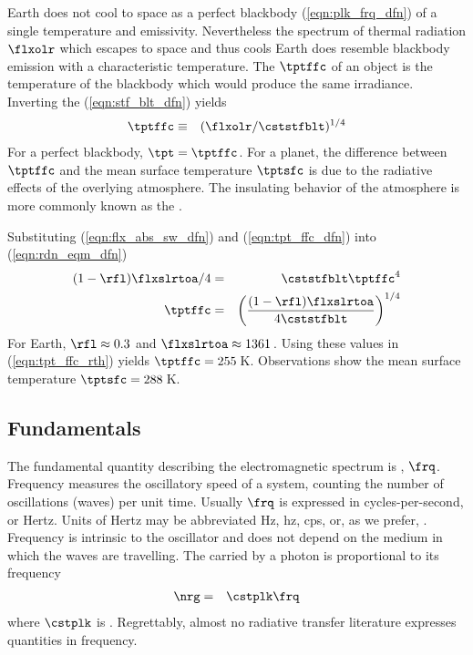 \documentclass[12pt]{article}
\begin{document}
Earth does not cool to space as a perfect blackbody
(\ref{eqn:plk_frq_dfn}) of a single temperature and emissivity.
Nevertheless the spectrum of thermal radiation $\flxolr$ which escapes
to space and thus cools Earth does resemble blackbody emission with a
characteristic temperature.
The  $\tptffc$ of an object is the
temperature of the blackbody which would produce the same irradiance.
Inverting the  (\ref{eqn:stf_blt_dfn})
yields
\begin{eqnarray}
\tptffc & \equiv & ( \flxolr / \cststfblt )^{1/4}
\label{eqn:tpt_ffc_dfn}
\end{eqnarray}
For a perfect blackbody, $\tpt = \tptffc$.
For a planet, the difference between $\tptffc$ and the mean surface 
temperature $\tptsfc$ is due to the radiative effects of the overlying
atmosphere.
The insulating behavior of the atmosphere is more commonly known as
the .

Substituting (\ref{eqn:flx_abs_sw_dfn}) and (\ref{eqn:tpt_ffc_dfn})
into (\ref{eqn:rdn_eqm_dfn})
\begin{eqnarray}
(1 - \rfl) \flxslrtoa / 4 & = & \cststfblt \tptffc^{4} \\
\tptffc & = & \left( \frac{(1 - \rfl) \flxslrtoa}
{4 \cststfblt} \right)^{1/4}
\label{eqn:tpt_ffc_rth}
\end{eqnarray}
For Earth, $\rfl \approx 0.3$ and $\flxslrtoa \approx 1361$\,\wxmS.
Using these values in (\ref{eqn:tpt_ffc_rth}) yields $\tptffc =
255$\,K\@.
Observations show the mean surface temperature $\tptsfc = 288$\,K\@.

\subsection[Fundamentals]{Fundamentals}\label{sxn:fnd}
The fundamental quantity describing the electromagnetic spectrum is
, $\frq$.
Frequency measures the oscillatory speed of a system, counting the
number of oscillations (waves) per unit time.
Usually $\frq$ is expressed in cycles-per-second, or Hertz.
Units of Hertz may be abbreviated Hz, hz, cps, or, as we prefer, \xs.
Frequency is intrinsic to the oscillator and does not depend on the
medium in which the waves are travelling.
The  carried by a photon is proportional to its
frequency 
\begin{eqnarray}
\nrg & = & \cstplk \frq
\label{eqn:nrg_dfn}
\end{eqnarray}
where $\cstplk$ is .
Regrettably, almost no radiative transfer literature expresses
quantities in frequency.
\end{document}

